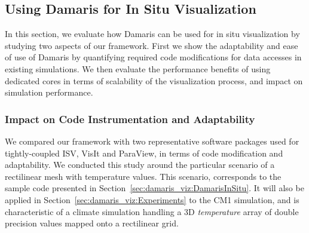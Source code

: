 \subsection{Using Damaris for In Situ Visualization}\label{sec:insitu_eval}

In this section, we evaluate how Damaris can be used for in situ visualization by
studying two aspects of our framework. First we show the adaptability
and ease of use of Damaris by quantifying required code modifications for data accesses
in existing simulations. 
We then evaluate the performance benefits of using 
dedicated cores in terms of scalability of the visualization process,
and impact on simulation performance.

\subsubsection{Impact on Code Instrumentation and Adaptability}

We compared our framework with two representative software packages 
used for tightly-coupled ISV, VisIt and ParaView, 
in terms of code modification and adaptability. 
We conducted this study around the particular 
scenario of a rectilinear mesh with temperature values. This scenario, 
corresponds to the sample code presented in Section~\ref{sec:damaris_viz:DamarisInSitu}.
It will also be applied in  Section~\ref{sec:damaris_viz:Experiments} to the CM1 
simulation, and is characteristic of a climate simulation handling a 3D 
\emph{temperature} array of double precision values mapped onto a rectilinear grid.

%	


